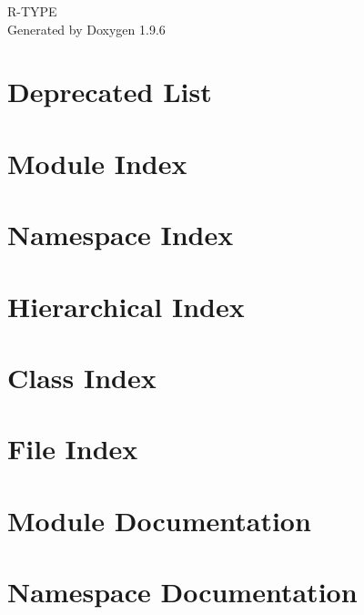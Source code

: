 \documentclass[twoside]{book}
\newcommand{\+}{\discretionary{\mbox{\scriptsize$\hookleftarrow$}}{}{}}
\newcommand{\clearemptydoublepage}{%
    \newpage{\pagestyle{empty}\cleardoublepage}%
  }
\begin{document}
  \raggedbottom
    \hypersetup{pageanchor=false,
                bookmarksnumbered=true,
                pdfencoding=unicode
               }
  \begin{titlepage}
  \vspace*{7cm}
  \begin{center}%
  {\Large R-\/\+TYPE}\\
  \vspace*{1cm}
  {\large Generated by Doxygen 1.9.6}\\
  \end{center}
  \end{titlepage}
  \clearemptydoublepage
  \tableofcontents
  \clearemptydoublepage
  \hypersetup{pageanchor=true}
\chapter{Deprecated List}
\label{deprecated}

\chapter{Module Index}

\chapter{Namespace Index}

\chapter{Hierarchical Index}

\chapter{Class Index}

\chapter{File Index}

\chapter{Module Documentation}






\chapter{Namespace Documentation}



\end{document}
